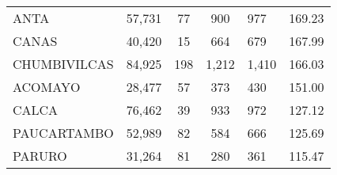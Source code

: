 \begin{tabular}{lrcclr}
	\cellcolor[HTML]{FFFF99}ANTA                                   & 57,731                                                         & 77                                                         & 900                  & 977                                                                 & 169.23                                                                       \\
	\cellcolor[HTML]{FFFF99}CANAS                                  & 40,420                                                         & 15                                                         & 664                  & 679                                                                 & 167.99                                                                       \\
	\cellcolor[HTML]{C6E0B4}CHUMBIVILCAS                           & 84,925                                                         & 198                                                        & 1,212                & 1,410                                                               & 166.03                                                                       \\
	\cellcolor[HTML]{C6E0B4}ACOMAYO                                & 28,477                                                         & 57                                                         & 373                  & 430                                                                 & 151.00                                                                       \\
	\cellcolor[HTML]{C6E0B4}CALCA                                  & 76,462                                                         & 39                                                         & 933                  & 972                                                                 & 127.12                                                                       \\
	\cellcolor[HTML]{C6E0B4}PAUCARTAMBO                            & 52,989                                                         & 82                                                         & 584                  & 666                                                                 & 125.69                                                                       \\
	\cellcolor[HTML]{C6E0B4}PARURO                                 & 31,264                                                         & 81                                                         & 280                  & 361                                                                 & 115.47                                                                       \\

\end{tabular}
